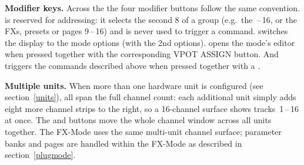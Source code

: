 \noindent
\textbf{Modifier keys.} Across the \fsm the four modifier
buttons follow the same convention. \shift is reserved for addressing:
it selects the second 8 of a group (e.g.~the \,--\,16, or the FXs,
presets or pages 9\,--\,16) and is never used to trigger a command. \option
switches the display to the mode options (with \shift \option the 2nd
options). \alt opens the mode's editor when pressed together with the
corresponding VPOT ASSIGN button. And \control triggers the commands
described above when pressed together with a \vpot.

\noindent
\textbf{Multiple units.} When more than one hardware unit is
configured (see section~\ref{units}), all \fsm span the
full channel count: each additional unit simply adds eight more
channel strips to the right, so a 16-channel surface shows
tracks~1\,--\,16 at once. The \bankdu and \channeldu buttons move the
whole channel window across all units together. The FX-Mode uses the same
multi-unit channel surface; parameter banks and pages are handled within
the FX-Mode as described in section~\ref{plugmode}.


